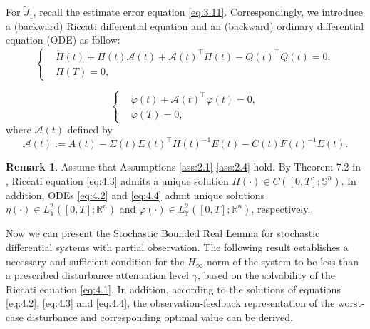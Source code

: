 \documentclass[lettersize,journal]{IEEEtran}
\theoremstyle{plain}
\theoremstyle{definition}
\newtheorem{rmk}[thm]{Remark}
\begin{document}
For $\widetilde{J}_1$, recall the estimate error equation \eqref{eq:3.11}. Correspondingly, we introduce a (backward) Riccati differential equation and an (backward) ordinary differential equation (ODE) as follow:
\begin{equation}\label{eq:4.3}
	\left\{
	\begin{aligned}
		& \dot{\Pi}(t) + \Pi(t)\mathcal{A}(t) + \mathcal{A}(t)^{\top}\Pi(t) -Q(t)^{\top}Q(t) = 0,\\
		& \Pi(T) = 0,
	\end{aligned}
	\right.
\end{equation}

\begin{equation}\label{eq:4.4}
	\left\{
	\begin{aligned}
		& \dot{\varphi}(t) + \mathcal{A}(t)^{\top}\varphi(t) = 0,\\
		& \varphi(T) = 0,
	\end{aligned}
	\right.
\end{equation}
where $\mathcal{A}(t)$ defined by \[\mathcal{A}(t) := A(t) - \Sigma(t)E(t)^{\top}H(t)^{-1}E(t) - C(t)F(t)^{-1}E(t).\]

\begin{rmk}\label{rmk:4.2}
	Assume that Assumptions \ref{ass:2.1}-\ref{ass:2.4} hold. By Theorem 7.2 in \cite{Yong1999}, Riccati equation \eqref{eq:4.3} admits a unique solution $\Pi(\cdot) \in C([0,T];\mathbb{S}^n)$. In addition, ODEs \eqref{eq:4.2} and \eqref{eq:4.4} admit unique solutions $\eta(\cdot) \in L^2_{\mathbb{Y}}([0,T];\mathbb{R}^n)$ and $\varphi(\cdot) \in L^2_{\mathbb{Y}}([0,T];\mathbb{R}^n)$, respectively.
\end{rmk}


Now we can present the Stochastic Bounded Real Lemma for stochastic differential systems with partial observation. The following result establishes a necessary and sufficient condition for the $H_\infty$ norm of the
system to be less than a prescribed disturbance attenuation level $\gamma$, based on the solvability of the Riccati equation \eqref{eq:4.1}. In addition, according to the solutions of equations \eqref{eq:4.2}, \eqref{eq:4.3} and \eqref{eq:4.4}, the observation-feedback representation of the worst-case disturbance and corresponding optimal value can be derived.
\end{document}

